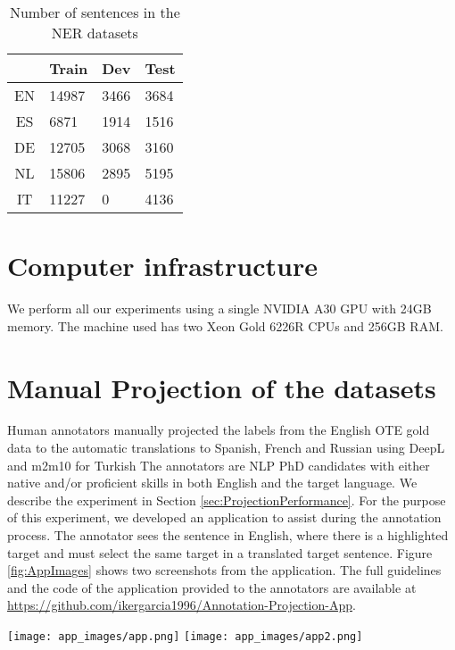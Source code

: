 \documentclass[11pt]{article}
\begin{document}
\begin{table}[htbp]
    \centering
\begin{tabular}{c|lll}
& Train & Dev & Test \\
\hline
EN & 14987 & 3466 & 3684 \\
ES & 6871 & 1914 & 1516 \\
DE & 12705 & 3068 & 3160 \\
NL & 15806 & 2895 & 5195 \\
IT & 11227 & 0 & 4136 \\
\end{tabular}
    \caption{Number of sentences in the NER datasets}
    \label{tab:NerDatasetSize}
\end{table}

\section{Computer infrastructure}
We perform all our experiments using a single NVIDIA A30 GPU with 24GB memory. The machine used has two Xeon Gold 6226R CPUs and 256GB RAM. 

\section{Manual Projection of the datasets}
\label{apen:ManualProjectionDescription}
Human annotators manually projected the labels from the English OTE gold data to the automatic translations to Spanish, French and Russian using DeepL and m2m10 for Turkish
The annotators are NLP PhD candidates with either native and/or proficient skills in both English and the target language. We describe the experiment in Section \ref{sec:ProjectionPerformance}.
For the purpose of this experiment, we developed an application to assist during the annotation process. The annotator sees the sentence in English, where there is a highlighted target and must select the same target in a translated target sentence. Figure \ref{fig:AppImages} shows two screenshots from the application. The full guidelines and the code of the application provided to the annotators are available at \url{https://github.com/ikergarcia1996/Annotation-Projection-App}. 

\begin{figure*}[t]
    \centering
    \texttt{[image: app\_images/app.png]}
    \texttt{[image: app\_images/app2.png]}
    \caption{Application used to manually annotate the projections}
    \label{fig:AppImages}
\end{figure*}
\end{document}
